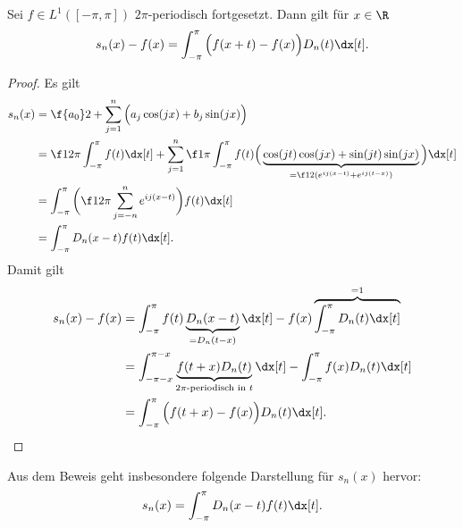 \begin{lem} \label{3.26}
	Sei $f \in L^1([-\pi, \pi])$ $2\pi$-periodisch fortgesetzt.
	Dann gilt für $x\in \R$
	\begin{align*}
		s_n(x) - f(x) = \int_{-\pi}^{\pi} \Big(f(x+t) - f(x)\Big) D_n(t) \dx[t].
	\end{align*}
	\begin{proof}
		Es gilt
		\begin{align*}
			s_n(x)
			&= \f {a_0}2 + \sum_{j=1}^n \Big( a_j \cos(jx) + b_j \sin(jx) \Big) \\
			&= \f 1{2 \pi} \int_{-\pi}^{\pi} f(t) \dx[t] + \sum_{j=1}^n \f 1{\pi} \int_{-\pi}^{\pi} f(t) \Big( \underbrace{\cos(jt) \cos(jx) + \sin(jt) \sin(jx)}_{= \f 12 ( e^{ij(x-t)} + e^{ij(t-x)})} \Big) \dx[t] \\
			&= \int_{-\pi}^{\pi} \bigg( \f 1{2\pi} \sum_{j=-n}^n e^{ij(x-t)} \bigg) f(t) \dx[t] \\
			&= \int_{-\pi}^{\pi} D_n(x-t) f(t) \dx[t].
		\end{align*}
		Damit gilt
		\begin{align*}
			s_n(x) - f(x)
			&= \int_{-\pi}^{\pi} f(t) \underbrace{D_n(x-t)}_{=D_n(t-x)} \dx[t] - f(x) \overbrace{\int_{-\pi}^{\pi} D_n(t) \dx[t]}^{=1} \\
			&= \int_{-\pi-x}^{\pi-x} \underbrace{f(t + x)D_n(t)}_{\text{$2\pi$-periodisch in $t$}} \dx[t] - \int_{-\pi}^\pi f(x) D_n(t) \dx[t] \\
			&= \int_{-\pi}^{\pi} \Big( f(t + x) - f(x) \Big) D_n(t) \dx[t].
		\end{align*}
	\end{proof}
	\begin{note}
		Aus dem Beweis geht insbesondere folgende Darstellung für $s_n(x)$ hervor:
		\begin{align*}
			s_n(x) = \int_{-\pi}^{\pi} D_n(x-t) f(t) \dx[t].
		\end{align*}
	\end{note}
\end{lem}

